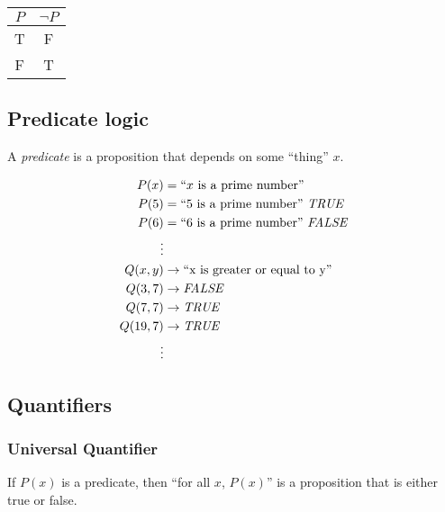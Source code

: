 \documentclass[11pt]{article}
\begin{document}
    \begin{center}
        \begin{tabular}{| c | c |} \hline
            $P$ & $\neg P$  \\ \hline
            T   &  F       \\ \hline 
            F   &  T       \\ \hline 
        \end{tabular}
    \end{center}

    \subsection{Predicate logic}

    A \emph{predicate} is a proposition that depends on some ``thing'' $x$.

    \begin{align*}
        P(x) &= \text{``$x$ is a prime number''} \\
        P(5) &= \text{``5 is a prime number'' \emph{TRUE}} \\
        P(6) &= \text{``6 is a prime number'' \emph{FALSE}} \\
        \vdots \\
        Q(x,y)  &\rightarrow \text{``x is greater or equal to y''} \\
        Q(3,7)  &\rightarrow \text{\emph{FALSE}} \\
        Q(7,7)  &\rightarrow \text{\emph{TRUE}} \\
        Q(19,7) &\rightarrow \text{\emph{TRUE}} \\
        \vdots
    \end{align*}

    \subsection{Quantifiers}

    \subsubsection{Universal Quantifier}

    If $P(x)$ is a predicate, then ``for all $x$, $P(x)$'' is a proposition that is either true or false. 

    \pagebreak
\end{document}
